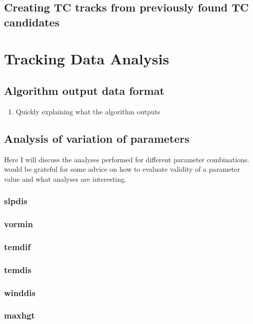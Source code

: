\subsection{Creating TC tracks from previously found TC candidates}

\section{Tracking Data Analysis}
\subsection{Algorithm output data format}
\begin{enumerate}
    \item Quickly explaining what the algorithm outputs
\end{enumerate}
\subsection{Analysis of variation of parameters}
Here I will discuss the analyses performed for different parameter combinations.
would be grateful for some advice on how to evaluate validity of a parameter value and what analyses are interesting.
\subsubsection{slpdis}
\subsubsection{vormin}
\subsubsection{temdif}
\subsubsection{temdis}
\subsubsection{winddis}
\subsubsection{maxhgt}




